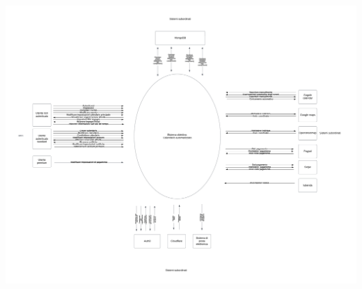 \begin{listaPersonale}[DC]{}
    \includegraphics[width=1\textwidth]{img/Diagrammi/Contesto/DiagrammaContesto.png}

\end{listaPersonale}